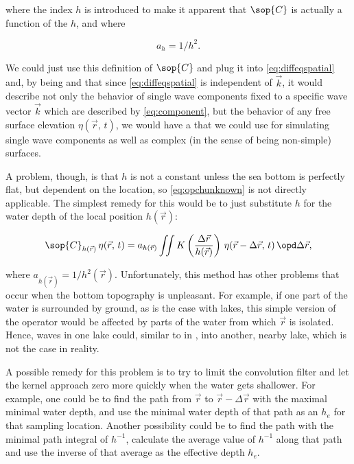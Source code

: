 where the index $h$ is introduced to make it apparent that $\sop{C}$ is actually a function of the  $h$, and where

\begin{equation} \label{eq:aofh}
a_h = 1/h^2.
\end{equation}

We could just use this definition of $\sop{C}$ and plug it into \eqref{eq:diffeqspatial} and, by being \naive and \assuming that since \eqref{eq:diffeqspatial} is independent of $\vec{k}$, it would describe not only the behavior of single wave components fixed to a specific wave vector $\vec{k}$ which are described by \eqref{eq:component}, but the behavior of any free surface elevation $\eta(\vec{r},\,t)$, we would have a \PDE that we could use for simulating single wave components as well as complex (in the sense of being non-simple) surfaces.

A problem, though, is that $h$ is not a constant unless the sea bottom is perfectly flat, but dependent on the location, so \eqref{eq:opchunknown} is not directly applicable. The simplest remedy for this would be to just substitute $h$ for the water depth of the local position $h(\vec{r})$:

\begin{equation} \label{eq:opchlocal}
\sop{C}_{h(\vec{r})}\,\eta(\vec{r},\,t) = a_{h(\vec{r})}\iint K\left(\frac{\Delta\vec{r}}{h(\vec{r})}\right)\,\eta(\vec{r}-\Delta\vec{r},\,t)\,\opd\Delta\vec{r},
\end{equation}

where $a_{h(\vec{r})} = 1/h^2(\vec{r})$. Unfortunately, this method has other problems that occur when the bottom topography is unpleasant. For example, if one part of the water is surrounded by ground, as is the case with lakes, this simple version of the operator would be affected by parts of the water from which $\vec{r}$ is isolated. Hence, waves in one lake could, similar to in , \tunnel into another, nearby lake, which is not the case in reality.

A possible remedy for this problem is to try to limit the convolution filter and let the kernel approach zero more quickly when the water gets shallower. For example, one could be to find the path from $\vec{r}$ to $\vec{r}-\Delta\vec{r}$ with the maximal minimal water depth, and use the minimal water depth of that path as an  $h_e$ for that sampling location. Another possibility could be to find the path with the minimal path integral of $h^{-1}$, calculate the average value of $h^{-1}$ along that path and use the inverse of that average as the effective depth $h_e$.

